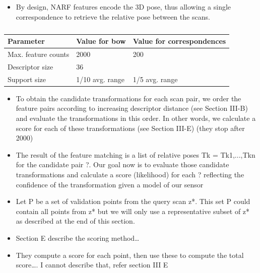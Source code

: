 \begin{itemize}
    \item By design, NARF features encode the 3D pose, thus allowing a single correspondence to retrieve the relative pose between the scans.
\end{itemize}

\begin{table}[H]
    \centering
    \begin{tabular}{@{}lll@{}}
        \toprule
        \textbf{Parameter}  & \textbf{Value for \gls*{bow}} & \textbf{Value for correspondences} \\
        \hline
        Max. feature counts & 2000                          & 200                                \\
        Descriptor size     & 36                            &                                    \\
        Support size        & 1/10 avg. range               & 1/5 avg. range                     \\
        \bottomrule
    \end{tabular}
    \caption{}
    \label{tab:chap_slam_narf_parameters}
\end{table}

\begin{itemize}
    \item To obtain the candidate transformations for each scan pair, we order the feature pairs according to increasing descriptor distance (see Section III-B) and evaluate the transformations in this order. In other words, we calculate a score for each of these transformations (see Section III-E) (they stop after 2000)
    \item The result of the feature matching is a list of relative poses Tk = Tk1,...,Tkn for the candidate pair ?. Our goal now is to evaluate those candidate transformations and calculate a score (likelihood) for each ? reflecting the confidence of the transformation given a model of our sensor
    \item Let P be a set of validation points from the query scan z*. This set P could contain all points from z* but we will only use a representative subset of z* as described at the end of this section.
    \item Section E describe the scoring method\dots
    \item They compute a score for each point, then use these to compute the total score\dots. I cannot describe that, refer section III E
\end{itemize}

